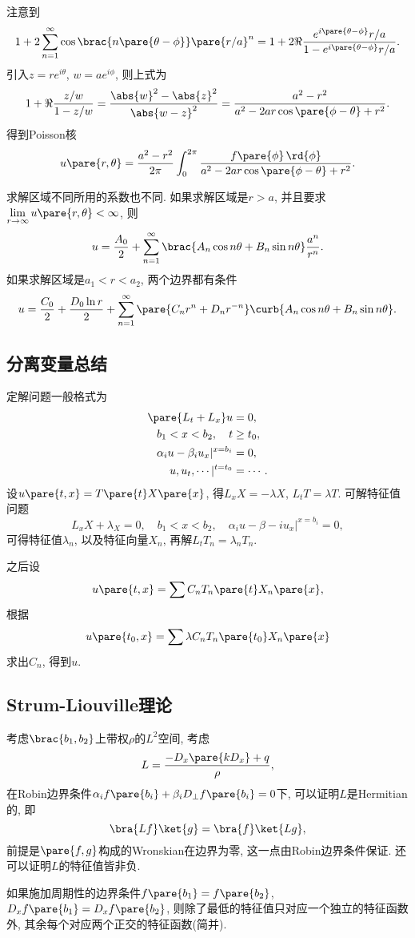 \documentclass[hidelinks]{ctexart}
\begin{document}
注意到
\[ 1+2\sum_{n=1}^\infty \cos\brac{n\pare{\theta - \phi}}\pare{r/a}^n = 1 + 2\Re \frac{e^{i\pare{\theta - \phi}}r/a}{1-e^{i\pare{\theta - \phi}}r/a}. \]
引入$z=re^{i\theta}$, $w = ae^{i\phi}$, 则上式为
\[ 1+\Re \frac{z/w}{1-z/w} = \frac{\abs{w}^2 - \abs{z}^2}{\abs{w-z}^2} = \frac{a^2-r^2}{a^2 - 2ar\cos\pare{\phi - \theta} + r^2}. \]
得到Poisson核
\[ u\pare{r,\theta} = \frac{a^2 - r^2}{2\pi} \int_0^{2\pi} \frac{f\pare{\phi}\,\rd{\phi}}{a^2 - 2ar\cos\pare{\phi - \theta}+r^2}. \]
\begin{remark}
    求解区域不同所用的系数也不同. 如果求解区域是$r>a$, 并且要求$\displaystyle \lim_{r\rightarrow \infty} u\pare{r,\theta} < \infty$, 则
    \[ u = \frac{A_0}{2} + \sum_{n=1}^\infty \brac{A_n \cos n\theta + B_n \sin n\theta} \frac{a^n}{r^n}. \]
    如果求解区域是$a_1 < r < a_2$, 两个边界都有条件
    \[ u = \frac{C_0}{2} + \frac{D_0 \ln r}{2} + \sum_{n=1}^\infty \pare{C_n r^n + D_nr^{-n}}\curb{A_n \cos n\theta + B_n\sin n\theta}. \]
\end{remark}

\subsection*{分离变量总结} %
\label{sub:分离变量总结}

定解问题一般格式为
\begin{align*}
    \pare{L_t + L_x} u &= 0,\\
    b_1 < x < b_2,\quad t &\ge t_0, \\
    \alpha_i u - \beta_i u_x \vert^{x=b_i} &= 0, \\
    u,u_t,\cdots \vert^{t=t_0} &= \cdots.
\end{align*}
设$u\pare{t,x} = T\pare{t}X\pare{x}$, 得$L_x X = -\lambda X$, $L_t T = \lambda T$. 可解特征值问题
\[ L_x X + \lambda_X = 0,\quad b_1 < x < b_2,\quad \alpha_i u - \beta-i u_x \vert^{x=b_i} = 0, \]
可得特征值$\lambda_n$, 以及特征向量$X_n$, 再解$L_t T_n = \lambda_n T_n$.
\par
之后设
\[ u\pare{t,x} = \sum C_nT_n\pare{t}X_n\pare{x}, \]
根据
\[ u\pare{t_0,x} = \sum \lambda C_nT_n\pare{t_0}X_n\pare{x} \]
求出$C_n$, 得到$u$.


\subsection{Strum-Liouville理论} %
\label{sub:strum_liouville理论}

考虑$\brac{b_1,b_2}$上带权$\rho$的$L^2$空间, 考虑
\[ L = \frac{-D_x \pare{kD_x}+q}{\rho}, \]
在Robin边界条件$\alpha_i f\pare{b_i} + \beta_i D_\perp f\pare{b_i}=0$下, 可以证明$L$是Hermitian的, 即
\[ \bra{Lf}\ket{g} = \bra{f}\ket{Lg}, \]
前提是$\pare{f,g}$构成的Wronskian在边界为零, 这一点由Robin边界条件保证. 还可以证明$L$的特征值皆非负.
\par
如果施加周期性的边界条件$f\pare{b_1} = f\pare{b_2}$, $D_x f\pare{b_1} = D_x f\pare{b_2}$, 则除了最低的特征值只对应一个独立的特征函数外, 其余每个对应两个正交的特征函数(简并).
\end{document}
